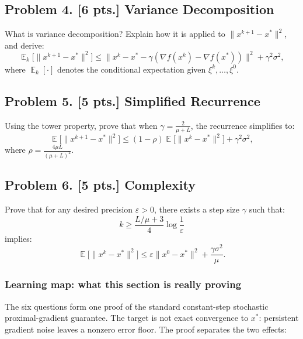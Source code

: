 \documentclass[11pt,a4paper]{article}
\DeclareMathOperator{\E}{\mathbb{E}}
\theoremstyle{definition}
\begin{document}
\subsection{Problem 4. [6 pts.] Variance Decomposition}\label{prob:spr2025-opt-4}
What is variance decomposition? Explain how it is applied to $\|x^{k+1} - x^*\|^2$, and derive:
\[
\E_k \bigl[ \|x^{k+1} - x^*\|^2 \bigr] \le \|x^k - x^* - \gamma (\nabla f(x^k) - \nabla f(x^*))\|^2 + \gamma^2 \sigma^2,
\]
where $\E_k[\cdot]$ denotes the conditional expectation given $\xi^k, \dots, \xi^0$.

\subsection{Problem 5. [5 pts.] Simplified Recurrence}\label{prob:spr2025-opt-5}
Using the tower property, prove that when $\gamma = \frac{2}{\mu + L}$, the recurrence simplifies to:
\[
\E \bigl[ \|x^{k+1} - x^*\|^2 \bigr] \le (1 - \rho) \E \bigl[ \|x^k - x^*\|^2 \bigr] + \gamma^2 \sigma^2,
\]
where $\rho = \frac{4\mu L}{(\mu + L)^2}$.

\subsection{Problem 6. [5 pts.] Complexity}\label{prob:spr2025-opt-6}
Prove that for any desired precision $\varepsilon > 0$, there exists a step size $\gamma$ such that:
\[
k \ge \frac{L/\mu + 3}{4} \log \frac{1}{\varepsilon}
\]
implies:
\[
\E \bigl[ \|x^k - x^*\|^2 \bigr] \le \varepsilon \|x^0 - x^*\|^2 + \frac{\gamma \sigma^2}{\mu}.
\]

\subsubsection{Learning map: what this section is really proving}

The six questions form one proof of the standard constant-step stochastic proximal-gradient guarantee. The target is not exact convergence to $x^*$: persistent gradient noise leaves a nonzero error floor. The proof separates the two effects:
\end{document}
